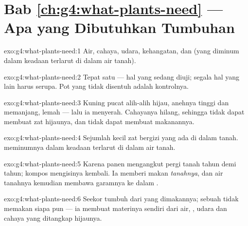 \section*{Bab \ref{ch:g4:what-plants-need} --- Apa yang Dibutuhkan Tumbuhan}

\begin{solution}{exo:g4:what-plants-need:1}
Air, cahaya, udara, kehangatan, dan  (yang diminum dalam
keadaan terlarut di dalam air tanah).
\end{solution}

\begin{solution}{exo:g4:what-plants-need:2}
Tepat satu --- hal yang sedang diuji; segala hal yang lain harus
serupa. Pot yang tidak disentuh adalah kontrolnya.
\end{solution}

\begin{solution}{exo:g4:what-plants-need:3}
Kuning pucat alih-alih hijau, anehnya tinggi dan memanjang, lemah ---
lalu ia menyerah. Cahayanya hilang, sehingga  tidak dapat
membuat zat hijaunya, dan tidak dapat membuat makanannya.
\end{solution}

\begin{solution}{exo:g4:what-plants-need:4}
Sejumlah kecil zat bergizi yang ada di dalam tanah. 
meminumnya dalam keadaan terlarut di dalam air tanah.
\end{solution}

\begin{solution}{exo:g4:what-plants-need:5}
Karena panen mengangkut pergi  tanah tahun demi tahun;
kompos mengisinya kembali. Ia memberi makan \emph{tanahnya}, dan air
tanahnya kemudian membawa garamnya ke dalam .
\end{solution}

\begin{solution}{exo:g4:what-plants-need:6}
Seekor  tumbuh dari  yang dimakannya; sebuah
 tidak memakan siapa pun --- ia membuat materinya sendiri dari
air, , udara dan  cahaya yang ditangkap 
hijaunya.
\end{solution}

